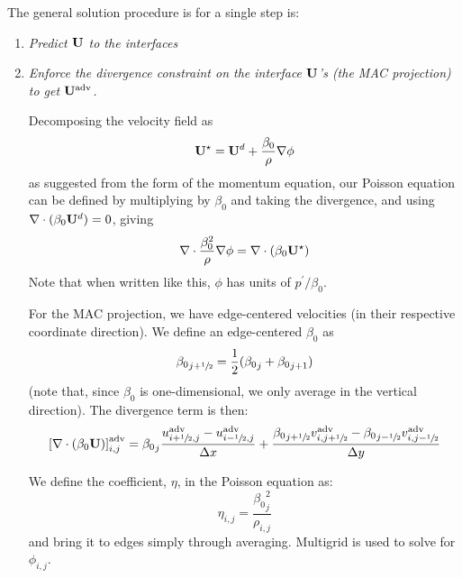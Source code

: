 The general solution procedure is for a single step is:
\begin{enumerate}
  \renewcommand{\labelenumi}{\Roman{enumi}.}
  
\item {\em Predict ${\bf U}$ to the interfaces}

\item {\em Enforce the divergence constraint on the interface ${\bf U}$'s (the
  MAC projection) to get ${\bf U}^\mathrm{adv}$.}

  Decomposing the velocity field as
  \begin{equation}
    {\bf U}^\star = {\bf U}^d + \frac{\beta_0}{\rho} \nabla \phi
  \end{equation}
  as suggested from the form of the momentum equation, our Poisson
  equation can be defined by multiplying by $\beta_0$ and taking the
  divergence, and using $\nabla \cdot (\beta_0 {\bf U}^d) = 0$, giving
  \begin{equation}
    \nabla \cdot \frac{\beta_0^2}{\rho} \nabla \phi =
    \nabla \cdot (\beta_0 {\bf U}^\star)
  \end{equation}
  Note that when written like this, $\phi$ has units of
  $p^\prime/\beta_0$. 
  
  For the MAC projection, we have edge-centered velocities (in their
  respective coordinate direction).  We define an edge-centered $\beta_0$ as
  \begin{equation}
    {\beta_0}_{j+{\sfrac{1}{2}}} = \frac{1}{2} ( {\beta_0}_j + {\beta_0}_{j+1} )
  \end{equation}
  (note that, since $\beta_0$ is one-dimensional, we only average in
  the vertical direction).  The divergence term is then:
  \begin{equation}
    \left [ \nabla \cdot (\beta_0 {\bf U}) \right ]_{i,j}^\mathrm{adv} =
          {\beta_0}_j \frac{u^\mathrm{adv}_{i+{\sfrac{1}{2}},j} - 
            u^\mathrm{adv}_{i-{\sfrac{1}{2}},j}}{\Delta x} +
          \frac{{\beta_0}_{j+{\sfrac{1}{2}}} v^\mathrm{adv}_{i,j+{\sfrac{1}{2}}} - 
            {\beta_0}_{j-{\sfrac{1}{2}}} v^\mathrm{adv}_{i,j-{\sfrac{1}{2}}} }{\Delta y}
  \end{equation}
  
  We define the coefficient, $\eta$, in the Poisson equation as:
  \begin{equation}
    \eta_{i,j} = \frac{{\beta_0}_j^2}{\rho_{i,j}}
  \end{equation}
  and bring it to edges simply through averaging.  Multigrid is
  used to solve for $\phi_{i,j}$.


\end{enumerate}
